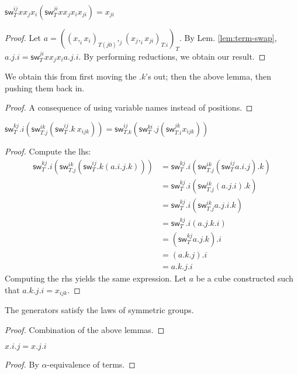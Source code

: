 \documentclass[10pt,a4paper]{article}
\newcommand\CC[4]{(#2,_{#1} #3)_{#4}}
\newcommand\sw[2]{\mathsf{sw}^{#1}_{#2}}
\begin{document}
\begin{lemma}
  $\sw{ij} T x x_j x_i (\sw {ji} T x x_j x_i x_{ji}) = x_{ji}$
\end{lemma}
\begin{proof}
  Let $a = \CC j {\CC i x {x_i} {T(j0)}} {\CC i {x_j} {x_{ji}} {T.i}} T$.
  By Lem. \ref{lem:term-swap}, $a.j.i = \sw {ji} T x x_j x_i
  a.j.i$. By performing reductions, we obtain our result.
\end{proof}
\begin{lemma}[$σ_i^2 = 1$]
  We obtain this from first moving the $.k$'s out; then the above lemma, then pushing them back in.
\end{lemma}
\begin{lemma}[$σ_i ∘ σ_j = σ_j ∘ σ_i$ if $abs(j-i) > 1$]
  
\end{lemma}
\begin{proof}
  A consequence of using variable names instead of positions.
\end{proof}
\begin{lemma}
  [$\sigma_i ∘\sigma_{i+1} ∘\sigma_i = \sigma_{i+1} ∘\sigma_i ∘\sigma_{i+1}$]
  $\sw{kj}T.i (\sw{ik}{T.j} (\sw{ij}{T}.k~ x_{ijk})) = \sw{ij}{T.k} (\sw{ki}T.j  (\sw{jk}{T.i} x_{ijk}))$
\end{lemma}
\begin{proof}
  Compute the lhs:
  \begin{align*}
     \sw{kj}T.i (\sw{ik}{T.j} (\sw{ij}{T}.k (a.i.j.k)) ) 
    &= \sw{kj}T.i (\sw{ik}{T.j} (\sw{ij}{T} a.i.j).k ) \\
    &= \sw{kj}T.i (\sw{ik}{T.j} (a.j.i).k ) \\
    &= \sw{kj}T.i (\sw{ik}{T.j} a.j.i.k ) \\
    &= \sw{kj}T.i  (a.j.k.i) \\
    &= (\sw{kj}T  a.j.k).i \\
    &= (a.k.j).i \\
    &= a.k.j.i 
  \end{align*}
  Computing the rhs yields the same expression.
  Let $a$ be a cube constructed such that $a.k.j.i = x_{ijk}$.
\end{proof}
\begin{theorem}
  The generators satisfy the laws of symmetric groups.
\end{theorem}
\begin{proof}
  Combination of the above lemmas.
\end{proof}

\begin{lemma}\label{lem:param-var}
  $x.i.j = x.j.i$
\end{lemma}
\begin{proof}
  By $α$-equivalence of terms.
\end{proof}
\end{document}
